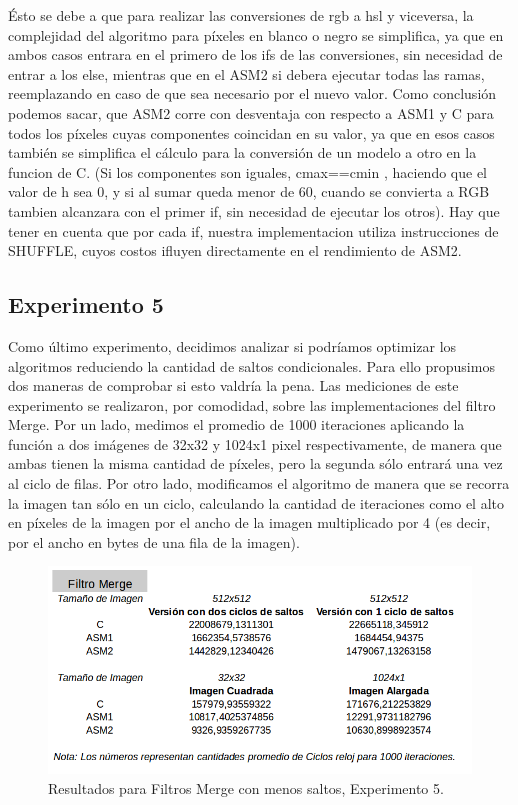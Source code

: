 Ésto se debe a que para realizar las conversiones de rgb a hsl y viceversa, la complejidad del algoritmo para píxeles en blanco o negro se simplifica, ya que en ambos casos entrara en el primero de los ifs de las conversiones, sin necesidad de entrar a los else, mientras que en el ASM2 si debera ejecutar todas las ramas, reemplazando en caso de que sea necesario por el nuevo valor.
Como conclusión podemos sacar, que ASM2 corre con desventaja con respecto a ASM1 y C para todos los píxeles cuyas componentes coincidan en su valor, ya que en esos casos también se simplifica el cálculo para la conversión de un modelo a otro en la funcion de C. (Si los componentes son iguales, cmax==cmin , haciendo que el valor de h sea 0, y si al sumar queda menor de 60, cuando se convierta a RGB tambien alcanzara con el primer if, sin necesidad de ejecutar los otros).
Hay que tener en cuenta que por cada if, nuestra implementacion utiliza instrucciones de SHUFFLE, cuyos costos ifluyen directamente en el rendimiento de ASM2.

\newpage

\subsection{Experimento 5}


Como último experimento, decidimos analizar si podríamos optimizar los algoritmos reduciendo la cantidad de saltos condicionales. Para ello propusimos dos maneras de comprobar si esto valdría la pena. 
Las mediciones de este experimento se realizaron, por comodidad, sobre las implementaciones del filtro Merge.
Por un lado, medimos el promedio de 1000 iteraciones aplicando la función a dos imágenes de 32x32 y 1024x1 pixel respectivamente, de manera que ambas tienen la misma cantidad de píxeles, pero la segunda sólo entrará una vez al ciclo de filas.
Por otro lado, modificamos el algoritmo de manera que se recorra la imagen tan sólo en un ciclo, calculando la cantidad de iteraciones como el alto en píxeles de la imagen por el ancho de la imagen multiplicado por 4 (es decir, por el ancho en bytes de una fila de la imagen).

\begin{figure}[ht!]
\centering
\includegraphics[width=130mm]{imagenes/resultados/tabla-saltos.png}
\caption{Resultados para Filtros Merge con menos saltos, Experimento 5.}
\end{figure}

